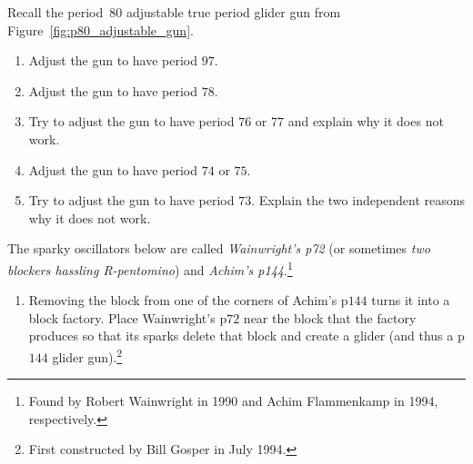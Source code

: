 \begin{multicols}{2}
\mfilbreak


\begin{problem}\label{exer:p80_adjustable_manipulate}
	Recall the period~$80$ adjustable true period glider gun from Figure~\ref{fig:p80_adjustable_gun}.\smallskip
	
	\begin{enumerate}[label=\bf\color{ocre}(\alph*)]
		\item Adjust the gun to have period $97$.
		
		\item Adjust the gun to have period $78$.
		
		\item Try to adjust the gun to have period $76$ or $77$ and explain why it does not work.
		
		\item Adjust the gun to have period $74$ or $75$.
		
		\item Try to adjust the gun to have period $73$. Explain the two independent reasons why it does not work.
	\end{enumerate}
\end{problem}


\mfilbreak


\begin{problem}\label{exer:p144_gun_from_achim}
	The sparky oscillators below are called \emph{Wainwright's p72} (or sometimes \emph{two blockers hassling R-pentomino}) and \emph{Achim's p144}.\footnote{Found by Robert Wainwright in 1990 and Achim Flammenkamp in 1994, respectively.}
	\begin{center}
		 \quad {}
	\end{center}
	
	\begin{enumerate}[label=\bf\color{ocre}(\alph*)]
		\item Removing the block from one of the corners of Achim's p$144$ turns it into a block factory. Place Wainwright's p$72$ near the block that the factory produces so that its sparks delete that block and create a glider (and thus a p$144$ glider gun).\footnote{First constructed by Bill Gosper in July 1994.}
		

\end{enumerate}
\end{problem}
\end{multicols}
